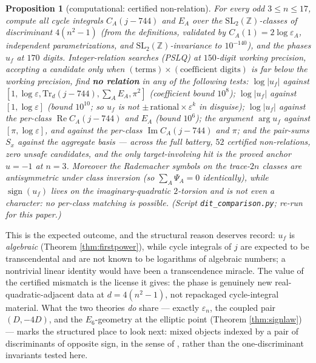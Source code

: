 \documentclass[11pt]{amsart}
\numberwithin{equation}{section}
\theoremstyle{plain}
\newtheorem{proposition}[theorem]{Proposition}
\theoremstyle{definition}
\theoremstyle{remark}
\newcommand{\Z}{\mathbb{Z}}
\newcommand{\SL}{\mathrm{SL}}
\newcommand{\im}{\operatorname{Im}}
\newcommand{\re}{\operatorname{Re}}
\newcommand{\sgn}{\operatorname{sign}}
\begin{document}
\begin{proposition}[computational: certified non-relation]
\label{prop:dit}
For every odd $3 \le n \le 17$, compute all cycle integrals
$C_A(j - 744)$ and $E_A$ over the $\SL_2(\Z)$-classes of discriminant
$4(n^2 - 1)$ (from the definitions, validated by $C_A(1) =
2\log\varepsilon_A$, independent parametrizations, and
$\SL_2(\Z)$-invariance to $10^{-140}$), and the phases $u_f$ at $170$
digits.  Integer-relation searches (PSLQ) at $150$-digit working
precision, accepting a candidate only when
$(\text{terms})\times(\text{coefficient digits})$ is far below the
working precision, find \textbf{no relation} in any of the following
tests: $\log|u_f|$ against $[1, \log\varepsilon,
\mathrm{Tr}_d(j{-}744), \sum_A E_A, \pi^2]$ (coefficient bound
$10^8$); $\log|u_f|$ against $[1, \log\varepsilon]$ (bound $10^{10}$;
so $u_f$ is not $\pm\,\text{rational}\times\varepsilon^k$ in
disguise); $\log|u_f|$ against the per-class $\re C_A(j{-}744)$ and
$E_A$ (bound $10^6$); the argument $\arg u_f$ against
$[\pi, \log\varepsilon]$, and against the per-class
$\im C_A(j{-}744)$ and $\pi$; and the pair-sums
$S_x$ against the aggregate basis --- across the full battery, $52$
certified non-relations, zero unsafe candidates, and the only
target-involving hit is the proved anchor $u = -1$ at $n = 3$.
Moreover the Rademacher symbols on the trace-$2n$ classes are
antisymmetric under class inversion (so $\sum_A \Psi_A = 0$
identically), while $\sgn(u_f)$ lives on the imaginary-quadratic
$2$-torsion and is not even a character: no per-class matching is
possible.  \emph{(Script \texttt{dit\_comparison.py}; re-run for this
paper.)}
\end{proposition}

This is the expected outcome, and the structural reason deserves
record: $u_f$ is \emph{algebraic} (Theorem \ref{thm:firstpower}),
while cycle integrals of $j$ are expected to be transcendental and are
not known to be logarithms of algebraic numbers; a nontrivial linear
identity would have been a transcendence miracle.  The value of the
certified mismatch is the license it gives: the phase is genuinely new
real-quadratic-adjacent data at $d = 4(n^2 - 1)$, not repackaged
cycle-integral material.  What the two theories \emph{do} share ---
exactly $\varepsilon_n$, the coupled pair $(D, -4D)$, and the
$E_6$-geometry at the elliptic point (Theorem \ref{thm:signlaw}) ---
marks the structured place to look next: mixed objects indexed by a
pair of discriminants of opposite sign, in the sense of
\cite{KatokSarnak1993}, rather than the one-discriminant invariants
tested here.
\end{document}
